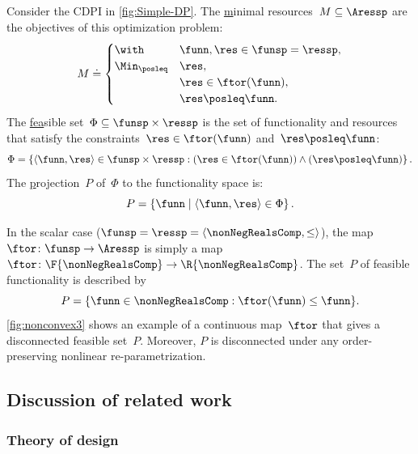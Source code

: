 \medskip{}

\begin{example}
\label{exa:one}Consider the CDPI in \cref{fig:Simple-DP}. The \uline{m}inimal
resources~$M\subseteq\Aressp$ are the objectives of this optimization
problem:
\[
M\doteq\begin{cases}
\with & \funn,\res\in\funsp=\ressp,\\
\Min_{\posleq} & \res,\\
 & \res\in\ftor(\funn),\\
 & \res\posleq\funn.
\end{cases}
\]
The \uline{fea}sible set~$\Phi\subseteq\funsp\times\ressp$ is
the set of functionality and resources that satisfy the constraints~$\res\in\ftor(\funn)$
and~$\res\posleq\funn$:
\begin{equation}
\Phi=\left\{ \langle\funn,\res\rangle\in\funsp\times\ressp:(\res\in\ftor(\funn))\wedge(\res\posleq\funn)\right\} .\label{eq:feasible}
\end{equation}
The \uline{p}rojection~$P$ of~$\Phi$ to the functionality space
is:
\[
P=\left\{ \funn\mid\left\langle \funn,\res\right\rangle \in\Phi\right\} .
\]

In the scalar case ($\funsp=\ressp=\langle\nonNegRealsComp,\leq\rangle$),
the map~$\ftor\colon\funsp\rightarrow\Aressp$ is simply a map~$\ftor\colon\F{\nonNegRealsComp}\rightarrow\R{\nonNegRealsComp}$.
The set~$P$ of feasible functionality is described by
\begin{equation}
P=\{\funn\in\nonNegRealsComp:\ftor(\funn)\leq\funn\}.\label{eq:Pfeasible}
\end{equation}
\cref{fig:nonconvex3} shows an example of a continuous map~$\ftor$
that gives a disconnected feasible set~$P$. Moreover, $P$ is disconnected
under any order-preserving nonlinear re-parametrization.

\end{example}




\subsection{Discussion of related work\label{sec:Discussion-of-related}}

\subsubsection{Theory of design}

